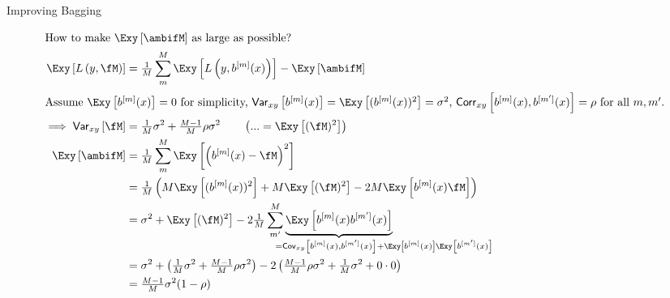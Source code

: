 \documentclass[11pt,compress,t,notes=noshow, xcolor=table]{beamer}
\begin{document}
\begin{vbframe}{Improving Bagging}
\begin{scriptsize}
\begin{align*}
\shortintertext{How to make $\Exy\left[\ambifM\right]$ as large as possible?}
\Exy\left[L\left(y, \fM \right)\right] &= \tfrac{1}{M}\sum^M_{m} \Exy\left[L\left(y, \blm \right)\right] - \Exy\left[\ambifM\right] \\
\shortintertext{Assume $\Exy\left[\blm\right] = 0$ for simplicity, $\var_{xy}\left[\blm\right] = \Exy\left[(\blm)^2\right] = \sigma^2$, $\corr_{xy}\left[\blm, \bl{m'}\right] = \rho$ for all $m, m'$.}
\implies 
\var_{xy}\left[\fM\right] &= \tfrac{1}{M} \sigma^2 +  \tfrac{M-1}{M} \rho \sigma^2 \qquad\left(... = \Exy\left[(\fM)^2\right]\right)\\
 \Exy\left[\ambifM\right] &= \tfrac{1}{M}\sum^M_{m} \Exy\left[\left(\blm- \fM\right)^2\right]\\
 & = \tfrac{1}{M}\left(M \Exy\left[(\blm)^2\right] + M \Exy\left[(\fM)^2\right] - 
     2 M \Exy\left[\blm\fM\right]\right) \\
  & = \sigma^2  + \Exy\left[(\fM)^2\right] - 2 \tfrac{1}{M}\sum^M_{m'} \underbrace{\Exy\left[\blm \bl{m'} \right]}_{\mathclap{\qquad\qquad\qquad\qquad= \cov_{xy}\left[\blm, \bl{m'} \right] + \Exy\left[\blm\right]\Exy\left[\bl{m'}\right]}} \\
  &=  \sigma^2  + \left(\tfrac{1}{M} \sigma^2 +   \tfrac{M-1}{M} \rho \sigma^2\right) - 2\left(\tfrac{M-1}{M} \rho\sigma^2 + \tfrac{1}{M}\sigma^2 + 0 \cdot 0 \right)\\
  &= \tfrac{M-1}{M} \sigma^2 (1-\rho)
\end{align*}
\end{scriptsize}


\end{vbframe}
\end{document}
